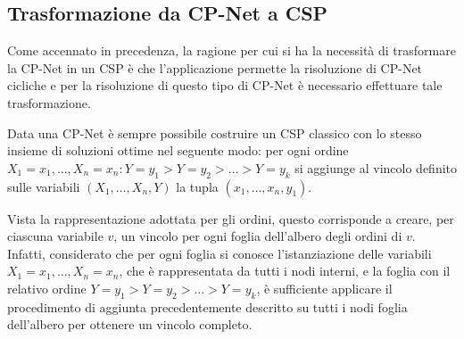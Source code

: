 \subsection{Trasformazione da CP-Net a CSP}
Come accennato in precedenza, la ragione per cui si ha la necessità di
trasformare la CP-Net in un CSP è che l'applicazione permette la
risoluzione di CP-Net cicliche e per la risoluzione di questo tipo di
CP-Net è necessario effettuare tale trasformazione.

Data una CP-Net è sempre possibile costruire un CSP classico con lo
stesso insieme di soluzioni ottime nel seguente modo: per ogni ordine
$X_1=x_1, ..., X_n=x_n: Y=y_1 > Y=y_2 > \dots > Y=y_k$ si aggiunge al
vincolo definito sulle variabili $(X_1, \dots, X_n, Y)$ la tupla
$(x_1, \dots, x_n, y_1)$.

Vista la rappresentazione adottata per gli ordini, questo corrisponde
a creare, per ciascuna variabile $v$, un vincolo per ogni foglia
dell'albero degli ordini di $v$.  Infatti, considerato che per ogni
foglia si conosce l'istanziazione delle variabili $X_1=x_1, ...,
X_n=x_n$, che è rappresentata da tutti i nodi interni, e la foglia con
il relativo ordine $Y=y_1 > Y=y_2 > ... > Y=y_k$, è sufficiente
applicare il procedimento di aggiunta precedentemente descritto su
tutti i nodi foglia dell'albero per ottenere un vincolo completo.
